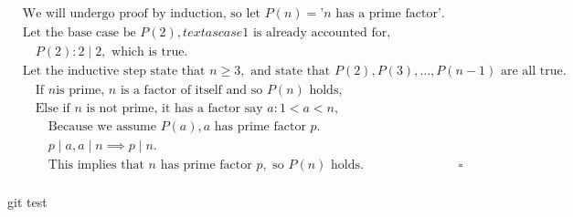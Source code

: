 \documentclass{article}
\begin{document}
                \begin{align*}
                    &\text{We will undergo proof by induction, so let }P(n) = \text{'} n\text{ has a prime factor'}.\\
                    &\text{Let the base case be } P(2), text{ as case } 1 \text{ is already accounted for},\\
                    &\quad P(2): 2\mid 2,\text{ which is true}.\\
                    &\text{Let the inductive step state that } n \geq 3,\text{ and state that } P(2), P(3), \dots, P(n-1)\text{ are all true}.\\
                    &\quad\text{If } n \text{is prime, }n\text{ is a factor of itself and so }P(n) \text{ holds},\\
                    &\quad\text{Else if } n \text{ is not prime, it has a factor say }a: 1 < a < n,\\
                    &\qquad\text{Because we assume }P(a), a\text{ has prime factor }p.\\
                    &\qquad p\mid a, a \mid n \implies p\mid n.\\
                    &\qquad\text{This implies that }n \text{ has prime factor }p,\text{ so }P(n) \text{ holds}. &\square\\
                \end{align*}

                git test
\end{document}
